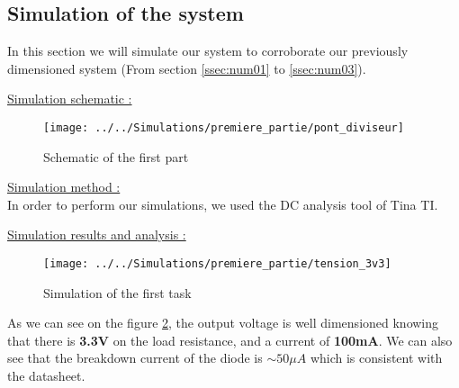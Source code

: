 \subsection{Simulation of the system} \label{ssecNum06}
{
In this section we will simulate our system to corroborate our previously dimensioned system (From section \ref{ssec:num01} to \ref{ssec:num03}).	
	
\underline{Simulation schematic :} \\

\begin{figure}[h]
	\centering
	\texttt{[image: ../../Simulations/premiere\_partie/pont\_diviseur]}
	\caption{Schematic of the first part}
	\label{fig:pontdiviseur}
\end{figure}
	
\underline{Simulation method :}\\
In order to perform our simulations, we used the DC analysis tool of Tina TI.

\underline{Simulation results and analysis :}\\
\begin{figure}[h]
	\centering
	\texttt{[image: ../../Simulations/premiere\_partie/tension\_3v3]}
	\caption{Simulation of the first task}
	\label{fig:tension3v3}
\end{figure}


As we can see on the figure \ref{fig:tension3v3}, the output voltage is well dimensioned knowing that there is \textbf{3.3V} on the load resistance, and a current of \textbf{100mA}. We can also see that the breakdown current of the diode is $ \sim 50 \mu A $ which is consistent with the datasheet.

}

\clearpage